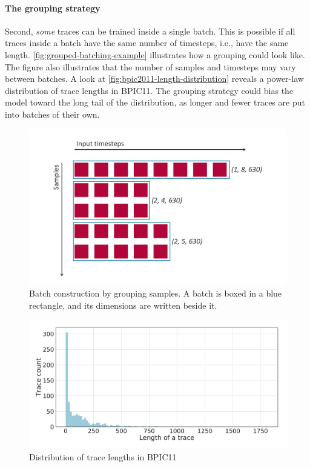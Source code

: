 \paragraph{The grouping strategy}
Second, \textit{some} traces can be trained inside a single batch.
This is possible if all traces inside a batch have the same number of timesteps, i.e., have the same length.
\autoref{fig:grouped-batching-example} illustrates how a grouping could look like.
The figure also illustrates that the number of samples and timesteps may vary between batches.
A look at \autoref{fig:bpic2011-length-distribution} reveals a power-law distribution of trace lengths in BPIC11.
The grouping strategy could bias the model toward the long tail of the distribution, as longer and fewer traces are put into batches of their own.

\begin{figure}[!htb]
    \centering
    \includegraphics[width=\textwidth]{gfx/grouped-batching.pdf}
    \caption[Grouping strategy for batches]{Batch construction by grouping samples. A batch is boxed in a blue rectangle, and its dimensions are written beside it.}
    \label{fig:grouped-batching-example}
\end{figure}

\begin{figure}[!htb]
    \centering
    \includegraphics[width=\textwidth]{gfx/bpic11-length-frequency.pdf}
    \caption{Distribution of trace lengths in BPIC11}
    \label{fig:bpic2011-length-distribution}
\end{figure}

